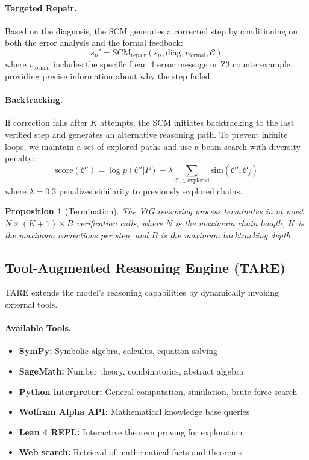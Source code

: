 \documentclass[11pt,a4paper]{article}
\newtheorem{proposition}{Proposition}[section]
\begin{document}
\paragraph{Targeted Repair.} Based on the diagnosis, the SCM generates a corrected step by conditioning on both the error analysis and the formal feedback:
\begin{equation}
    s_n' = \text{SCM}_{\text{repair}}(s_n, \text{diag}, v_{\text{formal}}, \mathcal{C})
\end{equation}
where $v_{\text{formal}}$ includes the specific Lean 4 error message or Z3 counterexample, providing precise information about why the step failed.

\paragraph{Backtracking.} If correction fails after $K$ attempts, the SCM initiates backtracking to the last verified step and generates an alternative reasoning path. To prevent infinite loops, we maintain a set of explored paths and use a beam search with diversity penalty:
\begin{equation}
    \text{score}(\mathcal{C}') = \log p(\mathcal{C}' | P) - \lambda \sum_{\mathcal{C}_j \in \text{explored}} \text{sim}(\mathcal{C}', \mathcal{C}_j)
\end{equation}
where $\lambda = 0.3$ penalizes similarity to previously explored chains.

\begin{proposition}[Termination]
The VtG reasoning process terminates in at most $N \times (K + 1) \times B$ verification calls, where $N$ is the maximum chain length, $K$ is the maximum corrections per step, and $B$ is the maximum backtracking depth.
\end{proposition}

\subsection{Tool-Augmented Reasoning Engine (TARE)}
\label{sec:tare}

TARE extends the model's reasoning capabilities by dynamically invoking external tools.

\paragraph{Available Tools.}
\begin{itemize}
    \item \textbf{SymPy:} Symbolic algebra, calculus, equation solving
    \item \textbf{SageMath:} Number theory, combinatorics, abstract algebra
    \item \textbf{Python interpreter:} General computation, simulation, brute-force search
    \item \textbf{Wolfram Alpha API:} Mathematical knowledge base queries
    \item \textbf{Lean 4 REPL:} Interactive theorem proving for exploration
    \item \textbf{Web search:} Retrieval of mathematical facts and theorems
\end{itemize}
\end{document}

